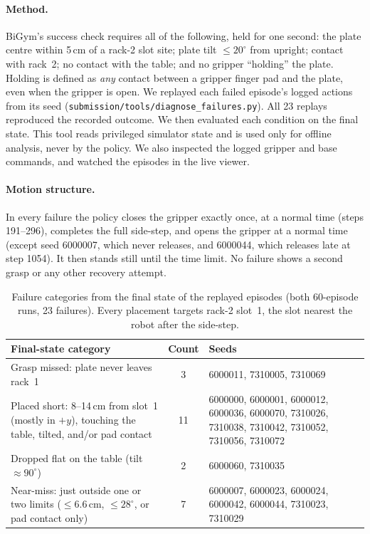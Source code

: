 \documentclass[11pt,a4paper]{article}
\begin{document}
\paragraph{Method.} BiGym's success check requires all of the following, held for
one second: the plate centre within 5\,cm of a rack-2 slot site; plate
tilt $\le 20^\circ$ from upright; contact with rack~2; no contact with the
table; and no gripper ``holding'' the plate. Holding is defined as
\emph{any} contact between a gripper finger pad and the plate, even when
the gripper is open. We replayed each failed episode's logged actions from its seed
(\texttt{submission/tools/diagnose\_failures.py}). All 23 replays reproduced
the recorded outcome. We then evaluated each condition on the final state.
This tool reads privileged simulator state and is used only for offline
analysis, never by the policy. We also inspected the logged gripper and base commands, and
watched the episodes in the live viewer.

\paragraph{Motion structure.} In every failure the policy closes the
gripper exactly once, at a normal time (steps 191--296), completes the full
side-step, and opens the gripper at a normal time (except seed 6000007,
which never releases, and 6000044, which releases late at step 1054). It
then stands still until the time limit. No failure shows a second grasp or
any other recovery attempt.

\begin{table}[h]
\centering
\begin{tabular}{p{4.3cm}cp{8.2cm}}
\toprule
Final-state category & Count & Seeds \\
\midrule
Grasp missed: plate never leaves rack~1 & 3 & 6000011, 7310005, 7310069 \\
Placed short: 8--14\,cm from slot~1 (mostly in $+y$), touching the table,
  tilted, and/or pad contact & 11 & 6000000, 6000001, 6000012, 6000036,
  6000070, 7310026, 7310038, 7310042, 7310052, 7310056, 7310072 \\
Dropped flat on the table (tilt $\approx 90^\circ$) & 2 & 6000060, 7310035 \\
Near-miss: just outside one or two limits ($\le 6.6$\,cm, $\le 28^\circ$,
  or pad contact only) & 7 & 6000007, 6000023, 6000024, 6000042, 6000044,
  7310023, 7310029 \\
\bottomrule
\end{tabular}
\caption{Failure categories from the final state of the replayed episodes
(both 60-episode runs, 23 failures). Every placement targets rack-2 slot~1,
the slot nearest the robot after the side-step.}
\label{tab:failures}
\end{table}
\end{document}
